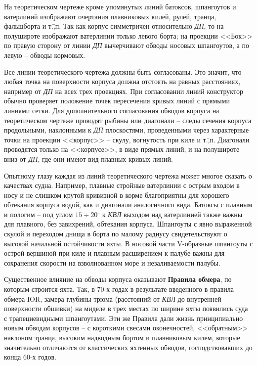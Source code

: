 \documentclass[a4paper, 12pt, twoside, final, book, russian, fittopage, cyremdash]{ncc}
\newcommand{\gr}{\ensuremath{^\circ}\xspace}
\newcommand{\motdo}{\div}
\begin{document}
На теоретическом чертеже кроме упомянутых линий батоксов, шпангоутов и ватерлиний изображают очертания плавниковых килей, рулей, транца, фальшборта и т.\=,п. Так как корпус симметричен относительно \textit{ДП}, то на полушироте изображают ватерлинии только левого борта; на проекции <<Бок>> по правую сторону от линии \textit{ДП} вычерчивают обводы носовых шпангоутов, а по левую \--- обводы кормовых.

Все линии теоретического чертежа должны быть согласованы. Это значит, что любая точка на поверхности корпуса должна отстоять на равных расстояниях, например от \textit{ДП} на всех трех проекциях. При согласовании линий конструктор обычно проверяет положение точек пересечения кривых линий с прямыми линиями сетки. Для дополнительного согласования обводов корпуса на теоретическом чертеже проводят рыбины или диагонали \--- следы сечения корпуса продольными, наклонными к \textit{ДП} плоскостями, проведенными через характерные точки на проекции <<корпус>> \--- скулу, вогнутость при киле и т.\=,п. Диагонали проводятся только на <<корпусе>>, в виде прямых линий, и на полушироте вниз от \textit{ДП}, где они имеют вид плавных кривых линий.

Опытному глазу каждая из линий теоретического чертежа может многое сказать о качествах судна. Например, плавные стройные ватерлинии с острым входом в носу и не слишком крутой кривизной в корме благоприятны для хорошего обтекания корпуса водой, как и диагонали аналогичного вида. Батоксы с плавным и пологим \--- под углом $15 \motdo 20\gr$ к \textit{КВЛ} выходом над ватерлинией также важны для плавного, без завихрений, обтекания корпуса. Шпангоуты с явно выраженной скулой и переходом днища в борта по малому радиусу свидетельствуют о высокой начальной остойчивости яхты. В носовой части V-образные шпангоуты с острой вершиной при киле и плавным расширением к палубе важны для сохранения скорости на взволнованном море и незаливаемости палубы. 

Существенное влияние на обводы корпуса оказывают \textbf{Правила обмера}, по которым строится яхта. Так, в 70-х годах в результате введенного в правила обмера IOR, замера глубины трюма (расстояний от \textit{КВЛ} до внутренней поверхности обшивки) на миделе в трех местах по ширине яхты появились суда с трапециевидными шпангоутами. Эти же Правила дали жизнь принципиально новым обводам корпусов \--- с короткими свесами оконечностей, <<обратным>> наклоном транца, высоким надводным бортом и плавниковым килем, которые значительно отличаются от классических яхтенных обводов, господствовавших до конца 60-х годов.
\end{document}
